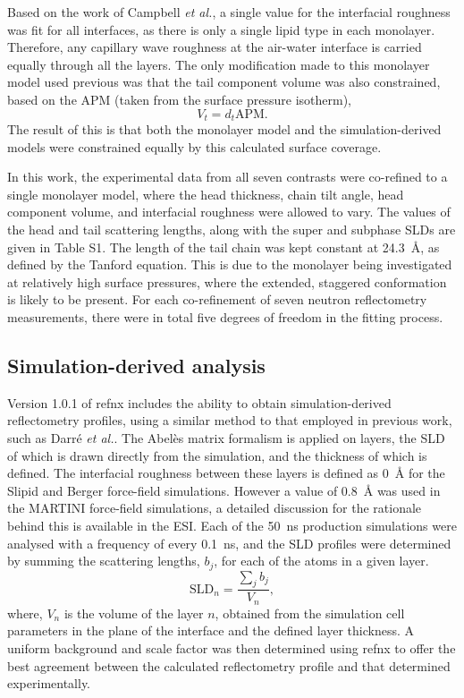 \documentclass[twoside,twocolumn,9pt]{article}
\begin{document}
%
Based on the work of Campbell \emph{et al.},\cite{Campbell2018} a single value for the interfacial roughness was fit for all interfaces, as there is only a single lipid type in each monolayer.
Therefore, any capillary wave roughness at the air-water interface is carried equally through all the layers.
The only modification made to this monolayer model used previous was that the tail component volume was also constrained, based on the APM (taken from the surface pressure isotherm),
%
\begin{equation}
  V_t = d_t \text{APM}.
\end{equation}
%
The result of this is that both the monolayer model and the simulation-derived models were constrained equally by this calculated surface coverage.

In this work, the experimental data from all seven contrasts were co-refined to a single monolayer model, where the head thickness, chain tilt angle, head component volume, and interfacial roughness were allowed to vary.
The values of the head and tail scattering lengths, along with the super and subphase SLDs are given in Table S1.
The length of the tail chain was kept constant at \SI{24.3}{\angstrom}, as defined by the Tanford equation.\cite{Tanford1980}
This is due to the monolayer being investigated at relatively high surface pressures, where the extended, staggered conformation is likely to be present.
For each co-refinement of seven neutron reflectometry measurements, there were in total five degrees of freedom in the fitting process.

\subsection{Simulation-derived analysis}
Version 1.0.1 of refnx\cite{Nelson2018,refnx} includes the ability to obtain simulation-derived reflectometry profiles, using a similar method to that employed in previous work, such as Darr\'{e} \emph{et al.}.\cite{Darre2015}
The Abel\`{e}s matrix formalism is applied on layers, the SLD of which is drawn directly from the simulation, and the thickness of which is defined.
The interfacial roughness between these layers is defined as \SI{0}{\angstrom} for the Slipid and Berger force-field simulations.
However a value of \SI{0.8}{\angstrom} was used in the MARTINI force-field simulations, a detailed discussion for the rationale behind this is available in the ESI.
Each of the \SI{50}{\nano\second} production simulations were analysed with a frequency of every \SI{0.1}{\nano\second}, and the SLD profiles were determined by summing the scattering lengths, $b_j$, for each of the atoms in a given layer.
%
\begin{equation}
  \text{SLD}_n = \frac{\sum_j{b_j}}{V_n},
\end{equation}
%
where, $V_n$ is the volume of the layer $n$, obtained from the simulation cell parameters in the plane of the interface and the defined layer thickness.
A uniform background and scale factor was then determined using refnx to offer the best agreement between the calculated reflectometry profile and that determined experimentally.
\end{document}
